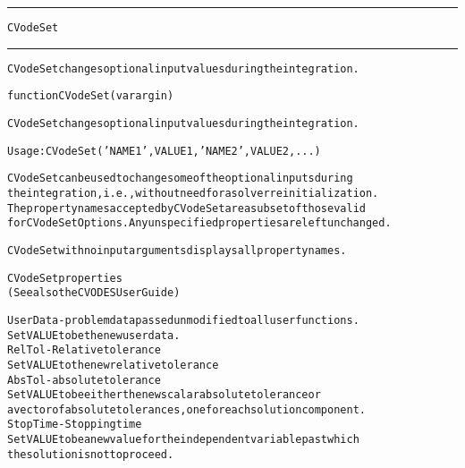\begin{samepage}
\hrule
\begin{center}
{\large \verb!CVodeSet!}
\label{p:CVodeSet}
\end{center}
\hrule\vspace{0.1in}



\begin{alltt}
CVodeSet changes optional input values during the integration.
\end{alltt}

\end{samepage}



\begin{samepage}


\begin{alltt}
function CVodeSet(varargin) 
\end{alltt}

\end{samepage}



\begin{alltt}
CVodeSet changes optional input values during the integration.

   Usage: CVodeSet('NAME1',VALUE1,'NAME2',VALUE2,...)

   CVodeSet can be used to change some of the optional inputs during
   the integration, i.e., without need for a solver reinitialization.
   The property names accepted by CVodeSet are a subset of those valid
   for CVodeSetOptions. Any unspecified properties are left unchanged.

   CVodeSet with no input arguments displays all property names. 

CVodeSet properties
(See also the CVODES User Guide)

UserData - problem data passed unmodified to all user functions.
  Set VALUE to be the new user data.
RelTol - Relative tolerance
  Set VALUE to the new relative tolerance
AbsTol - absolute tolerance
  Set VALUE to be either the new scalar absolute tolerance or
  a vector of absolute tolerances, one for each solution component.
StopTime - Stopping time
  Set VALUE to be a new value for the independent variable past which
  the solution is not to proceed.
\end{alltt}






\vspace{0.1in}
